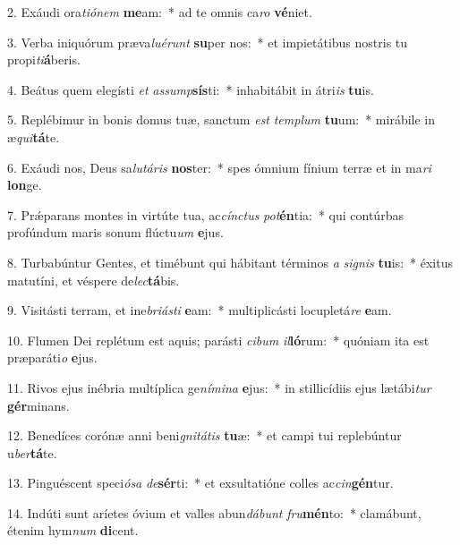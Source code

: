 2. Exáudi ora\textit{ti}\textit{ó}\textit{nem} \textbf{me}am:~*  ad te omnis ca\textit{ro} \textbf{vé}niet.\

3. Verba iniquórum præva\textit{lu}\textit{é}\textit{runt} \textbf{su}per nos:~*  et impietátibus nostris tu propi\textit{ti}\textbf{á}beris.\

4. Beátus quem elegísti \textit{et} \textit{as}\textit{sump}\textbf{sís}ti:~*  inhabitábit in átri\textit{is} \textbf{tu}is.\

5. Replébimur in bonis domus tuæ, sanctum \textit{est} \textit{tem}\textit{plum} \textbf{tu}um:~*  mirábile in æ\textit{qui}\textbf{tá}te.\

6. Exáudi nos, Deus sa\textit{lu}\textit{tá}\textit{ris} \textbf{nos}ter:~*  spes ómnium fínium terræ et in ma\textit{ri} \textbf{lon}ge.\

7. Prǽparans montes in virtúte tua, ac\textit{cínc}\textit{tus} \textit{pot}\textbf{én}tia:~*  qui contúrbas profúndum maris sonum flúctu\textit{um} \textbf{e}jus.\

8. Turbabúntur Gentes, et timébunt qui hábitant términos \textit{a} \textit{si}\textit{gnis} \textbf{tu}is:~*  éxitus matutíni, et véspere de\textit{lec}\textbf{tá}bis.\

9. Visitásti terram, et ine\textit{bri}\textit{ás}\textit{ti} \textbf{e}am:~*  multiplicásti locupletá\textit{re} \textbf{e}am.\

10. Flumen Dei replétum est aquis; parásti \textit{ci}\textit{bum} \textit{il}\textbf{ló}rum:~*  quóniam ita est præparáti\textit{o} \textbf{e}jus.\

11. Rivos ejus inébria multíplica ge\textit{ní}\textit{mi}\textit{na} \textbf{e}jus:~*  in stillicídiis ejus lætábi\textit{tur} \textbf{gér}minans.\

12. Benedíces corónæ anni beni\textit{gni}\textit{tá}\textit{tis} \textbf{tu}æ:~*  et campi tui replebúntur u\textit{ber}\textbf{tá}te.\

13. Pinguéscent speci\textit{ó}\textit{sa} \textit{de}\textbf{sér}ti:~*  et exsultatióne colles ac\textit{cin}\textbf{gén}tur.\

14. Indúti sunt aríetes óvium et valles abun\textit{dá}\textit{bunt} \textit{fru}\textbf{mén}to:~*  clamábunt, étenim hym\textit{num} \textbf{di}cent.\


